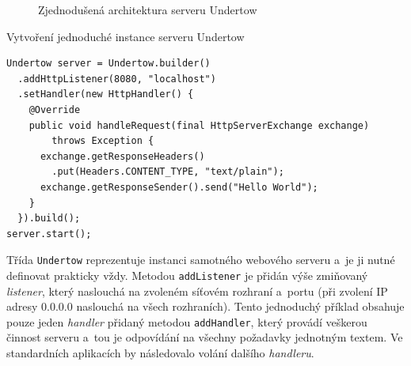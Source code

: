                 \begin{figure}[ht]
                    \begin{center}
                        \caption{Zjednodušená architektura serveru Undertow}
                        \label{imgUndertowArchitecture}
                    \end{center}
                \end{figure}
  
\begin{priklad} \label{prUndertow} Vytvoření jednoduché instance serveru Undertow
\begin{verbatim}
Undertow server = Undertow.builder()
  .addHttpListener(8080, "localhost")
  .setHandler(new HttpHandler() {
    @Override
    public void handleRequest(final HttpServerExchange exchange) 
        throws Exception {
      exchange.getResponseHeaders()
        .put(Headers.CONTENT_TYPE, "text/plain");
      exchange.getResponseSender().send("Hello World");
    }
  }).build();
server.start();
\end{verbatim}
\end{priklad}
                
                Třída \texttt{Undertow} reprezentuje instanci samotného
                webového serveru a~je ji nutné definovat prakticky vždy. Metodou
                \texttt{addListener} je přidán výše zmiňovaný \emph{listener}, který
                naslouchá na zvoleném síťovém rozhraní a~portu (při zvolení IP adresy 0.0.0.0 naslouchá
                na všech rozhraních). Tento jednoduchý příklad obsahuje pouze jeden \emph{handler} 
                přidaný metodou \texttt{addHandler}, který
                provádí veškerou činnost serveru a~tou je odpovídání na všechny požadavky jednotným textem. 
                Ve standardních aplikacích by následovalo volání dalšího \emph{handleru}.

